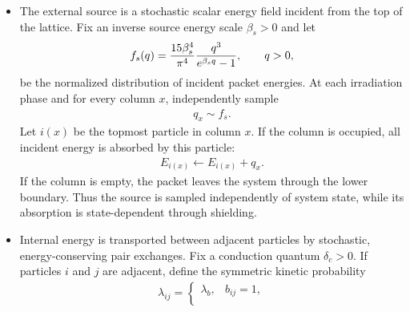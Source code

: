 \documentclass[12pt,letterpaper]{article}
\newcommand{\mb}{\mathbf}
\begin{document}
\begin{itemize}
be its exposed fraction. The local collision coefficient and thermal coupling are taken to depend linearly on exposure,
\begin{align*}
\gamma_{i}(\mb{X}) &= \gamma_{0}+\gamma_{1}\epsilon_{i}(\mb{X}), \\
\kappa_{i}(\mb{X}) &= \kappa_{0}+\kappa_{1}\epsilon_{i}(\mb{X}),
\end{align*}
where $\gamma_{0}>0$, $\gamma_{1}\geq 0$, and $0\leq\kappa_{0}\leq\kappa_{0}+\kappa_{1}\leq1$. The same exposure statistic is used for simplicity, but the mechanical and thermal parameters are independent. This makes both damping and heat loss state-dependent: exposed structures interact strongly with the bath, while shielded particles can retain energy for longer periods. The translational drag of a molecule $A$ is taken to be additive,
\begin{align*}
\Gamma_{A}^{\mathrm{tr}}(\mb{X}) = \sum_{i\in A}\gamma_{i}(\mb{X}).
\end{align*}
\item The external source is a stochastic scalar energy field incident from the top of the lattice. Fix an inverse source energy scale $\beta_{s}>0$ and let
\begin{align*}
f_{s}(q) = {15\beta_{s}^{4}\over\pi^{4}}{q^{3}\over e^{\beta_{s}q}-1}, \qquad q>0,
\end{align*}
be the normalized distribution of incident packet energies. At each irradiation phase and for every column $x$, independently sample
\begin{align*}
q_{x}\sim f_{s}.
\end{align*}
Let $i(x)$ be the topmost particle in column $x$. If the column is occupied, all incident energy is absorbed by this particle:
\begin{align*}
E_{i(x)} \leftarrow E_{i(x)} + q_{x}.
\end{align*}
If the column is empty, the packet leaves the system through the lower boundary. Thus the source is sampled independently of system state, while its absorption is state-dependent through shielding.
\item Internal energy is transported between adjacent particles by stochastic, energy-conserving pair exchanges. Fix a conduction quantum $\delta_{c}>0$. If particles $i$ and $j$ are adjacent, define the symmetric kinetic probability
\begin{align*}
\lambda_{ij} = \begin{cases}
\lambda_{b}, &b_{ij}=1, \\

\end{cases}
\end{align*}
\end{itemize}
\end{document}
